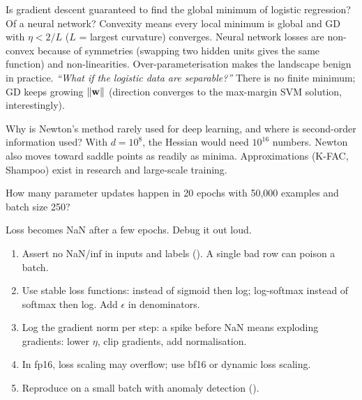 \begin{qa}{\deep Is gradient descent guaranteed to find the global minimum of logistic regression? Of a neural network?}
\why Convexity means every local minimum is global and GD with $\eta < 2/L$ ($L$ = largest curvature) converges. Neural
network losses are non-convex because of symmetries (swapping two hidden units gives the same function) and
non-linearities. Over-parameterisation makes the landscape benign in practice.
\pushes \emph{``What if the logistic data are separable?''} There is no finite minimum; GD keeps growing $\lVert \mathbf w\rVert$
(direction converges to the max-margin SVM solution, interestingly).
\end{qa}

\begin{qa}{Why is Newton's method rarely used for deep learning, and where is second-order information used?}
\why With $d = 10^8$, the Hessian would need $10^{16}$ numbers. Newton also moves toward saddle points as readily as minima.
Approximations (K-FAC, Shampoo) exist in research and large-scale training.
\end{qa}

\begin{qa}{How many parameter updates happen in 20 epochs with 50{,}000 examples and batch size 250?}
\end{qa}

\begin{qa}{\deep Loss becomes NaN after a few epochs. Debug it out loud.}
\why
\begin{enumerate}
\item Assert no NaN/inf in inputs and labels (). A single bad row can poison a batch.
\item Use stable loss functions:  instead of sigmoid then log; log-softmax instead of
  softmax then log. Add $\epsilon$ in denominators.
\item Log the gradient norm per step: a spike before NaN means exploding gradients: lower $\eta$, clip gradients, add
  normalisation.
\item In fp16, loss scaling may overflow; use bf16 or dynamic loss scaling.
\item Reproduce on a small batch with anomaly detection ().
\end{enumerate}
\end{qa}


